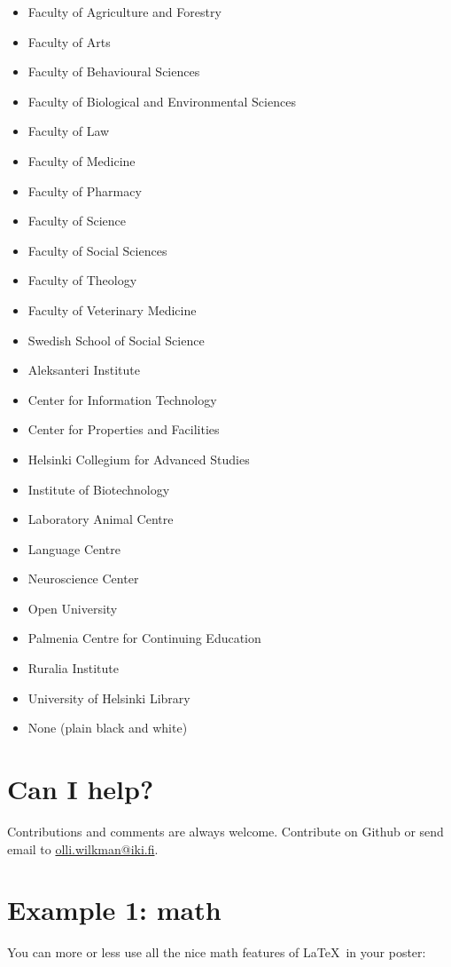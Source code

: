 \documentclass[final]{beamer}
\begin{document}
\begin{poster}
\begin{itemize}
\item Faculty of Agriculture and Forestry 
\item Faculty of Arts 
\item Faculty of Behavioural Sciences 
\item Faculty of Biological and Environmental Sciences 
\item Faculty of Law 
\item Faculty of Medicine 
\item Faculty of Pharmacy 
\item Faculty of Science 
\item Faculty of Social Sciences 
\item Faculty of Theology 
\item Faculty of Veterinary Medicine 
\item Swedish School of Social Science
\item Aleksanteri Institute
\item Center for Information Technology
\item Center for Properties and Facilities
\item Helsinki Collegium for Advanced Studies
\item Institute of Biotechnology
\item Laboratory Animal Centre
\item Language Centre
\item Neuroscience Center
\item Open University
\item Palmenia Centre for Continuing Education
\item Ruralia Institute
\item University of Helsinki Library
\item None (plain black and white)
\end{itemize}


\section{Can I help?}
Contributions and comments are always welcome. Contribute on Github or send email to \url{olli.wilkman@iki.fi}.


\newcolumn

\section{Example 1: math}
You can more or less use all the nice math features of \LaTeX~in your poster:


\end{poster}
\end{document}

